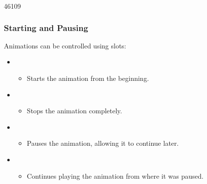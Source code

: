 \begin{slide}{46109}\frametitle{Starting and Pausing}
\vspace*{1.5em}

Animations can be controlled using slots:

\begin{itemize}
\item {}
\begin{itemize}
\item Starts the animation from the beginning.
\end{itemize}
\item {}
\begin{itemize}
\item Stops the animation completely.
\end{itemize}
\item {}
\begin{itemize}
\item Pauses the animation, allowing it to continue later.
\end{itemize}
\item {}
\begin{itemize}
\item Continues playing the animation from where it was paused.
\end{itemize}
\end{itemize}
\end{slide}


